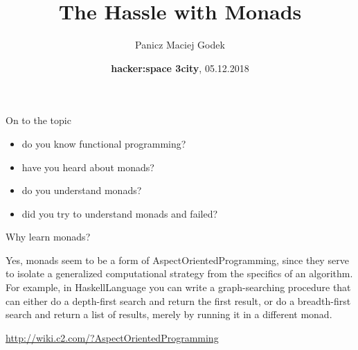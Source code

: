 \documentclass{beamer}
\title{\textbf{The Hassle with Monads}}
\author{Panicz Maciej Godek}
\institute{
  \tiny{\href{https://twitter.com/PaniczGodek}{\textbf{@PaniczGodek}}} \\
  \normalsize{\url{https://github.com/panicz/writings/tree/master/talks/elixir}}
}
\date{\textbf{hacker:space 3city}, 05.12.2018}
\begin{document}
\begin{frame}
  \titlepage
\end{frame}



\begin{frame}{On to the topic}
  \begin{itemize} \pause
  \item do you know functional programming? \pause
  \item have you heard about monads? \pause
  \item do you understand monads? \pause
  \item did you try to understand monads and failed?
  \end{itemize}
\end{frame}


\begin{frame}{Why learn monads?}

  \begin{displayquote}
    Yes, monads seem to be a form of AspectOrientedProgramming,
    since they serve to isolate a generalized computational
    strategy from the specifics of an algorithm. For example,
    in HaskellLanguage you can write a graph-searching
    procedure that can either do a depth-first search
    and return the first result, or do a breadth-first
    search and return a list of results, merely by running
    it in a different monad.
  \end{displayquote}

  \begin{flushright}
    {\footnotesize \url{http://wiki.c2.com/?AspectOrientedProgramming}}
  \end{flushright}
  
\end{frame}
\end{document}

